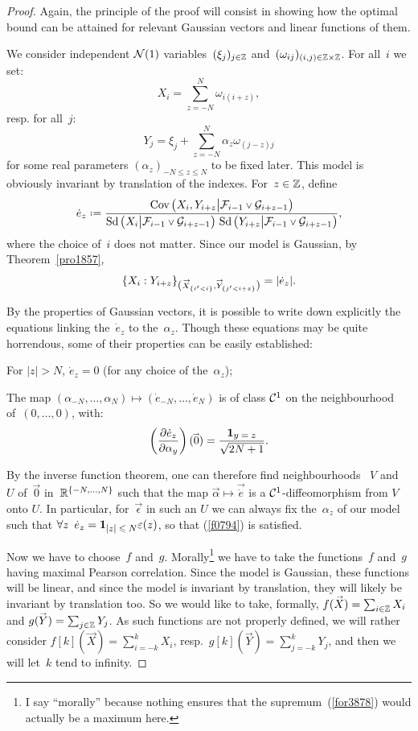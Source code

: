 \begingroup{}\begin{proof}
Again, the principle of the proof will consist in showing
how the optimal bound can be attained for relevant Gaussian vectors
and linear functions of them.

We consider independent $\mathcal{N}(1)$ variables~$(\xi_j)_{j\in\mathbb{Z}}$
and~$(\omega_{ij})_{(i,j)\in\mathbb{Z}\times\mathbb{Z}}$.
For all~$i$ we set:
\[ X_i = \sum_{z=-N}^{N} \omega_{i(i+z)} ,\]
resp. for all~$j$:
\[ Y_j = \xi_j + \sum_{z=-N}^{N} \alpha_z \omega_{(j-z)j} \]
for some real parameters $(\alpha_z)_{-N\leq z\leq N}$ to be fixed later.
This model is obviously invariant by translation of the indexes.
For~$z\in\mathbb{Z}$, define
\[ \dot{e}_z \coloneqq \frac{\Cov\big(X_i,Y_{i+z}\big|\mcal{F}_{i-1}\vee\mcal{G}_{i+z-1}\big)}
{\ecty\big(X_i\big|\mcal{F}_{i-1}\vee\mcal{G}_{i+z-1}\big)
\, \ecty\big(Y_{i+z}\big|\mcal{F}_{i-1}\vee\mcal{G}_{i+z-1}\big)} ,\]
where the choice of~$i$ does not matter.
Since our model is Gaussian, by Theorem~\ref{pro1857},
\[ \{ X_i : Y_{i+z} \}_{\mathlarger{(}\vec{X}_{\{i'<i\}},\vec{Y}_{\{j'<i+z\}}\mathlarger{)}}
= |\dot{e}_z| .\]

By the properties of Gaussian vectors,
it is possible to write down explicitly the equations linking
the~$\dot{e}_z$ to the~$\alpha_z$.
Though these equations may be quite horrendous, some of their properties can be easily established:
\begin{Clm}\label{c4330}\strut
\begin{ienumerate}
\item\label{i4332} For $|z|>N$, $\dot{e}_z = 0$ (for any choice of the~$\alpha_z$);
\item The map $(\alpha_{-N},\ldots,\alpha_N) \mapsto (\dot{e}_{-N},\ldots,\dot{e}_N)$
is of class $\mathcal{C}^1$ on the neighbourhood of~$(0,\ldots,0)$, with:
\[ \left(\frac{\partial \dot{e}_z}{\partial \alpha_y}\right)(\vec0) =
\frac{\1{y=z}}{\sqrt{2N+1}} .\]
\end{ienumerate}
\end{Clm}
%
\noindent By the inverse function theorem, one can therefore find neighbourhoods~%
$V$ and~$U$ of~$\vec0$ in~$\mathbb{R}^{\{-N,\ldots,N\}}$ such that
the map $\vec{\alpha} \mapsto \vec{\dot{e}}$ is a $\mathcal{C}^1$-diffeomorphism from $V$ onto $U$.
In particular, for~$\vec\epsilon$ in such an $U$ we can always fix the~$\alpha_z$
of our model such that $\forall z\enskip\dot{e}_z = \1{|z|\leq N}\epsilon(z)$,
so that (\ref{f0794}) is satisfied.

Now we have to choose~$f$ and~$g$.
Morally\footnote{I say ``morally'' because nothing ensures
that the supremum~(\ref{for3878}) would actually be a maximum here.}
we have to take the functions~$f$ and~$g$ having maximal Pearson correlation.
Since the model is Gaussian, these functions will be linear,
and since the model is invariant by translation,
they will likely be invariant by translation too.
So we would like to take, formally, $f(\vec{X}) = \sum_{i\in\ZZ} X_i$
and $g(\vec{Y}) = \sum_{j\in\ZZ} Y_j$.
%
As such functions are not properly defined,
we will rather consider
$f[k](\vec{X}) = \sum_{i=-k}^k X_i$,
resp.\ $g[k](\vec{Y}) = \sum_{j=-k}^k Y_j$,
and then we will let~$k$ tend to infinity.


\end{proof}
